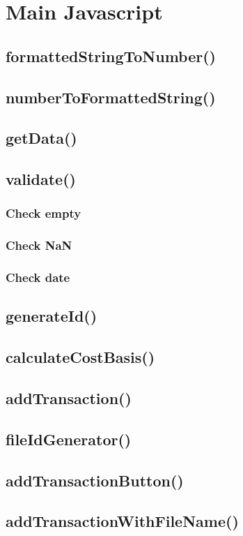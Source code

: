 \documentclass[letterpaper]{article}
\begin{document}
\newpage

\section{Main Javascript}\label{JS}
\subsection{formattedStringToNumber()}
\subsection{numberToFormattedString()}
\subsection{getData()}
\subsection{validate()}
\subsubsection{Check empty}
\subsubsection{Check NaN}
\subsubsection{Check date}
\subsection{generateId()}
\subsection{calculateCostBasis()}
\subsection{addTransaction()}
\subsection{fileIdGenerator()}
\subsection{addTransactionButton()}
\subsection{addTransactionWithFileName()}
\end{document}
